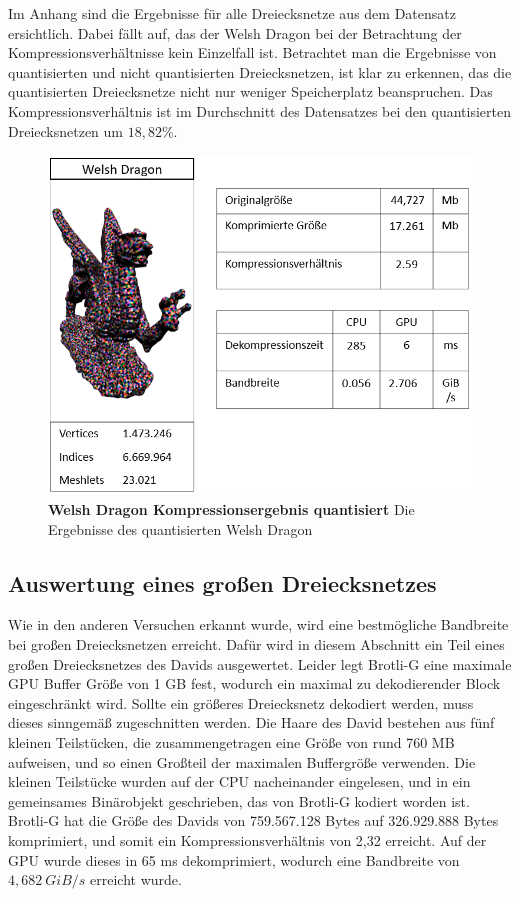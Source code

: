 Im Anhang sind die Ergebnisse für alle Dreiecksnetze aus dem Datensatz ersichtlich.
Dabei fällt auf, das der Welsh Dragon bei der Betrachtung der Kompressionsverhältnisse kein Einzelfall ist.
Betrachtet man die Ergebnisse von quantisierten und nicht quantisierten Dreiecksnetzen, ist klar zu erkennen, das die quantisierten Dreiecksnetze nicht nur weniger Speicherplatz beanspruchen.
Das Kompressionsverhältnis ist im Durchschnitt des Datensatzes bei den quantisierten Dreiecksnetzen um $\mathit{18,82\%}$.

\begin{figure}[htb]
  \centering  
  \includegraphics[scale=0.7]{Bilder/welshdragon_quantized_ergebniss.png}
  \caption[Welsh Dragon Kompressionsergebnis quantisiert]{\textbf{Welsh Dragon Kompressionsergebnis quantisiert} Die Ergebnisse des quantisierten Welsh Dragon }
  \label{fig:quantized_welsh_dragon}
\end{figure}

\subsection{Auswertung eines großen Dreiecksnetzes}
\label{subsec:auswertung3}
Wie in den anderen Versuchen erkannt wurde, wird eine bestmögliche Bandbreite bei großen Dreiecksnetzen erreicht.
Dafür wird in diesem Abschnitt ein Teil eines großen Dreiecksnetzes des Davids ausgewertet.
Leider legt Brotli-G eine maximale GPU Buffer Größe von 1 GB fest, wodurch ein maximal zu dekodierender Block eingeschränkt wird.
Sollte ein größeres Dreiecksnetz dekodiert werden, muss dieses sinngemäß zugeschnitten werden.
Die Haare des David bestehen aus fünf kleinen Teilstücken, die zusammengetragen eine Größe von rund 760 MB aufweisen, und so einen Großteil der maximalen Buffergröße verwenden.
Die kleinen Teilstücke wurden auf der CPU nacheinander eingelesen, und in ein gemeinsames Binärobjekt geschrieben, das von Brotli-G kodiert worden ist. \newline
Brotli-G hat die Größe des Davids von 759.567.128 Bytes auf 326.929.888 Bytes komprimiert, und somit ein Kompressionsverhältnis von 2,32 erreicht.
Auf der GPU wurde dieses in 65 ms dekomprimiert, wodurch eine Bandbreite von $\mathit{4,682 \ GiB/s}$ erreicht wurde.

